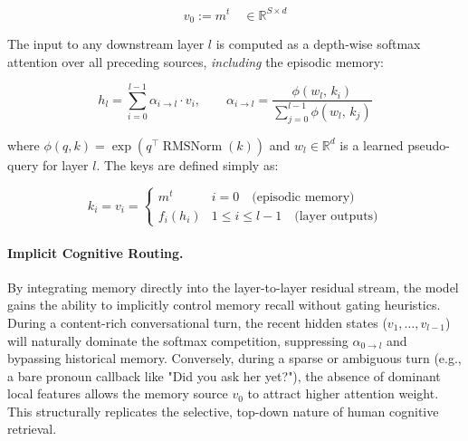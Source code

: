 \documentclass[11pt, a4paper]{article}
\begin{document}
\begin{equation}
    v_0 := m^t \quad \in \mathbb{R}^{S \times d}
\end{equation}

The input to any downstream layer $l$ is computed as a depth-wise softmax attention over all preceding sources, \textit{including} the episodic memory:

\begin{equation}
    h_l = \sum_{i=0}^{l-1} \alpha_{i \to l} \cdot v_i,
    \qquad
    \alpha_{i \to l} = \frac{\phi(w_l,\, k_i)}{\sum_{j=0}^{l-1} \phi(w_l,\, k_j)}
    \label{eq:memres_attn}
\end{equation}

where $\phi(q, k) = \exp\!\left(q^\top \operatorname{RMSNorm}(k)\right)$ and $w_l \in \mathbb{R}^d$ is a learned pseudo-query for layer $l$. The keys are defined simply as:

\begin{equation}
    k_i = v_i =
    \begin{cases}
        m^t & i = 0 \quad \text{(episodic memory)} \\
        f_i(h_i) & 1 \leq i \leq l-1 \quad \text{(layer outputs)}
    \end{cases}
\end{equation}

\paragraph{Implicit Cognitive Routing.}
By integrating memory directly into the layer-to-layer residual stream, the model gains the ability to implicitly control memory recall without gating heuristics. During a content-rich conversational turn, the recent hidden states ($v_1, \ldots, v_{l-1}$) will naturally dominate the softmax competition, suppressing $\alpha_{0 \to l}$ and bypassing historical memory. Conversely, during a sparse or ambiguous turn (e.g., a bare pronoun callback like "Did you ask her yet?"), the absence of dominant local features allows the memory source $v_0$ to attract higher attention weight. This structurally replicates the selective, top-down nature of human cognitive retrieval.
\end{document}

